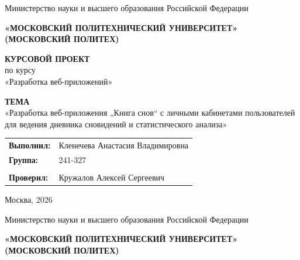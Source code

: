 \documentclass[14pt, a4paper]{extarticle}
\newcommand{\subject}{Разработка веб-приложений}
\newcommand{\theme}{Разработка веб-приложения „Книга снов“ с личными кабинетами пользователей для ведения дневника сновидений и статистического анализа}
\newcommand{\student}{Кленечева Анастасия Владимировна}
\newcommand{\group}{241-327}
\newcommand{\teacher}{Кружалов Алексей Сергеевич}
\begin{document}

\begin{center}
    {\small Министерство науки и высшего образования Российской Федерации}
    
    
    {\small \textbf{«МОСКОВСКИЙ ПОЛИТЕХНИЧЕСКИЙ УНИВЕРСИТЕТ»}} \\
    {\small \textbf{(МОСКОВСКИЙ ПОЛИТЕХ)}}

    \vspace{4cm}

    {\Large \textbf{КУРСОВОЙ ПРОЕКТ}} \\[1cm]
    {\large по курсу \\ «\subject»}

    \vspace{1.5cm}

    \textbf{ТЕМА} \\[0.3cm]
    {\large «\theme»}

    \vspace{3cm}

    \hfill
    \begin{tabular}{p{3cm} l}
        \textbf{Выполнил:} & \student \\
        \textbf{Группа:}   & \group \\
        \\
        \textbf{Проверил:}  & \teacher
    \end{tabular}

    \vfill

    Москва, 2026
\end{center}

\newpage


\begin{center}
    {\small Министерство науки и высшего образования Российской Федерации}


    {\small \textbf{«МОСКОВСКИЙ ПОЛИТЕХНИЧЕСКИЙ УНИВЕРСИТЕТ»}} \\
    {\small \textbf{(МОСКОВСКИЙ ПОЛИТЕХ)}}
\end{center}
\end{document}
